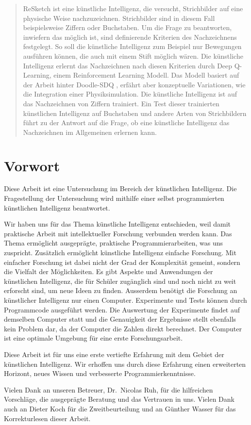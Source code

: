 \begin{abstract}\label{abstract} ReSketch ist eine künstliche Intelligenz, die
versucht, Strichbilder auf eine physische Weise nachzuzeichnen. Strichbilder
sind in diesem Fall beispielsweise Ziffern oder Buchstaben. Um die Frage zu
beantworten, inwiefern das möglich ist, sind definierende Kriterien des
Nachzeichnens festgelegt. So soll die künstliche Intelligenz zum Beispiel nur
Bewegungen ausführen können, die auch mit einem Stift möglich wären. Die
künstliche Intelligenz erlernt das Nachzeichnen nach diesen Kriterien durch Deep
Q-Learning, einem Reinforcement Learning Modell. Das Modell basiert auf der
Arbeit hinter Doodle-SDQ \cite{zhou_learning_2018}, erfährt aber konzeptuelle
Variationen, wie die Integration einer Physiksimulation. Die künstliche
Intelligenz ist auf das Nachzeichnen von Ziffern trainiert. Ein Test dieser
trainierten künstlichen Intelligenz auf Buchstaben und andere Arten von
Strichbildern führt zu der Antwort auf die Frage, ob eine künstliche Intelligenz
das Nachzeichnen im Allgemeinen erlernen kann.
\end{abstract}
    
\newpage
    
\section*{Vorwort}\label{vorwort} Diese Arbeit ist eine Untersuchung im Bereich
der künstlichen Intelligenz. Die Fragestellung der Untersuchung wird mithilfe
einer selbst programmierten künstlichen Intelligenz beantwortet.
    
Wir haben uns für das Thema künstliche Intelligenz entschieden, weil damit
praktische Arbeit mit intellektueller Forschung verbunden werden kann. Das Thema
ermöglicht ausgeprägte, praktische Programmierarbeiten, was uns zuspricht.
Zusätzlich ermöglicht künstliche Intelligenz einfache Forschung. Mit einfacher
Forschung ist dabei nicht der Grad der Komplexität gemeint, sondern die Vielfalt
der Möglichkeiten. Es gibt Aspekte und Anwendungen der künstlichen Intelligenz,
die für Schüler zugänglich sind und noch nicht zu weit erforscht sind, um neue
Ideen zu finden. Ausserdem benötigt die Forschung an künstlicher Intelligenz nur
einen Computer. Experimente und Tests können durch Programmcode ausgeführt
werden. Die Auswertung der Experimente findet auf demselben Computer statt und
die Genauigkeit der Ergebnisse stellt ebenfalls kein Problem dar, da der
Computer die Zahlen direkt berechnet. Der Computer ist eine optimale Umgebung
für eine erste Forschungsarbeit.
    
Diese Arbeit ist für uns eine erste vertiefte Erfahrung mit dem Gebiet der
künstlichen Intelligenz. Wir erhoffen uns durch diese Erfahrung einen
erweiterten Horizont, neues Wissen und verbesserte Programmierkenntnisse.
    
Vielen Dank an unseren Betreuer, Dr.\ Nicolas Ruh, für die hilfreichen
Vorschläge, die ausgeprägte Beratung und das Vertrauen in uns. Vielen Dank auch
an Dieter Koch für die Zweitbeurteilung und an Günther Wasser für das
Korrekturlesen dieser Arbeit.
    
